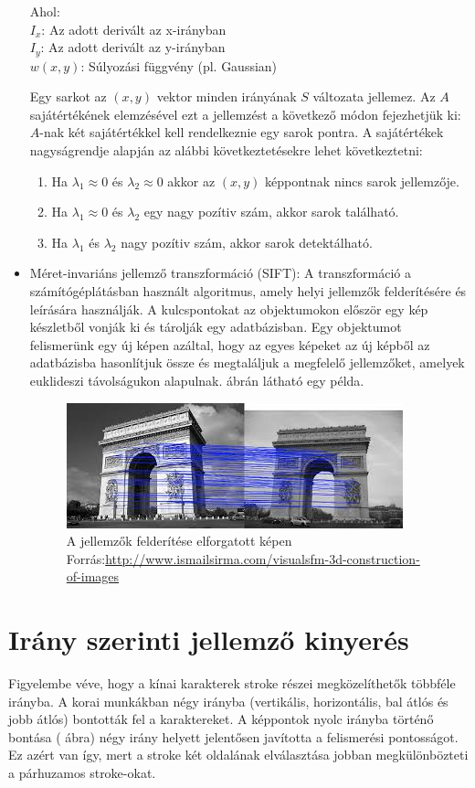 \begin{itemize}
Ahol:\\
$I_x$: Az adott derivált az x-irányban\\
$I_y$: Az adott derivált az y-irányban\\
$w(x, y)$: Súlyozási függvény (pl. Gaussian)

Egy sarkot az $(x, y)$ vektor minden irányának $S$ változata jellemez. Az $A$ sajátértékének elemzésével ezt a jellemzést a következő módon fejezhetjük ki: $A$-nak két sajátértékkel kell rendelkeznie egy sarok pontra. A sajátértékek nagyságrendje alapján az alábbi következtetésekre lehet következtetni:
\begin{enumerate}
\item Ha $\lambda _{1}\approx 0$ és $\lambda_2 \approx 0$ akkor az $(x,y)$ képpontnak nincs sarok jellemzője.
\item Ha $\lambda_1 \approx 0$ és $\lambda _{2}$ egy nagy pozítiv szám, akkor sarok található.
\item Ha $\lambda_1$ és $\lambda_2$ nagy pozítiv szám, akkor sarok detektálható.
\end{enumerate}
\item Méret-invariáns jellemző transzformáció (SIFT): A transzformáció a számítógéplátásban használt algoritmus, amely helyi jellemzők felderítésére és leírására használják. A kulcspontokat az objektumokon először egy kép készletből vonják ki és tárolják egy adatbázisban. Egy objektumot felismerünk egy új képen azáltal, hogy az egyes képeket az új képből az adatbázisba hasonlítjuk össze és megtaláljuk a megfelelő jellemzőket, amelyek euklideszi távolságukon alapulnak.  ábrán látható egy példa.
\begin{figure}[h]
\centering
\captionsetup{justification=centering}
\includegraphics[scale=1.0]{images/sift}
\caption{A jellemzők felderítése elforgatott képen \hspace{\textwidth}Forrás:\url{http://www.ismailsirma.com/visualsfm-3d-construction-of-images}}
\label{fig:sift}
\end{figure}
\end{itemize}

\section{Irány szerinti jellemző kinyerés}
Figyelembe véve, hogy a kínai karakterek stroke részei megközelíthetők többféle irányba. A korai munkákban négy irányba (vertikális, horizontális, bal átlós és jobb átlós) bontották fel a karaktereket. A képpontok nyolc irányba történő bontása ( ábra) négy irány helyett jelentősen javította a felismerési pontosságot. Ez azért van így, mert a stroke két oldalának elválasztása jobban megkülönbözteti a párhuzamos stroke-okat.

